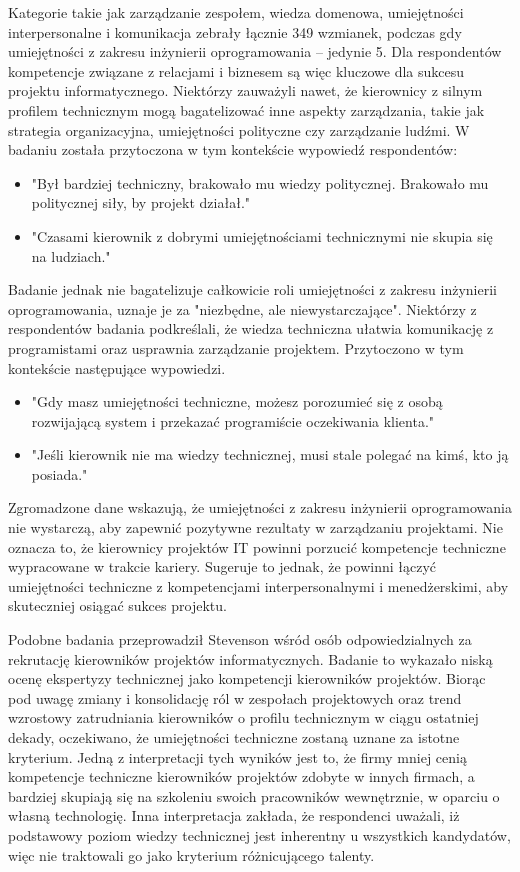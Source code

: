 Kategorie takie jak zarządzanie zespołem, wiedza domenowa, umiejętności interpersonalne i komunikacja zebrały łącznie 349 wzmianek, podczas gdy umiejętności z zakresu inżynierii oprogramowania – jedynie 5. Dla respondentów kompetencje związane z relacjami i biznesem są więc kluczowe dla sukcesu projektu informatycznego. Niektórzy zauważyli nawet, że kierownicy z silnym profilem technicznym mogą bagatelizować inne aspekty zarządzania, takie jak strategia organizacyjna, umiejętności polityczne czy zarządzanie ludźmi. W badaniu została przytoczona w tym kontekście wypowiedź respondentów:
\begin{itemize}
    \item"Był bardziej techniczny, brakowało mu wiedzy politycznej. Brakowało mu politycznej siły, by projekt działał."
    \item"Czasami kierownik z dobrymi umiejętnościami technicznymi nie skupia się na ludziach." 
\end{itemize}

Badanie jednak nie bagatelizuje całkowicie roli umiejętności z zakresu inżynierii oprogramowania, uznaje je za "niezbędne, ale niewystarczające". Niektórzy z respondentów badania podkreślali, że wiedza techniczna ułatwia komunikację z programistami oraz usprawnia zarządzanie projektem. Przytoczono w tym kontekście następujące wypowiedzi.
\begin{itemize}
    \item"Gdy masz umiejętności techniczne, możesz porozumieć się z osobą rozwijającą system i przekazać programiście oczekiwania klienta."
    \item"Jeśli kierownik nie ma wiedzy technicznej, musi stale polegać na kimś, kto ją posiada."    
\end{itemize}

Zgromadzone dane wskazują, że umiejętności z zakresu inżynierii oprogramowania nie wystarczą, aby zapewnić pozytywne rezultaty w zarządzaniu projektami. Nie oznacza to, że kierownicy projektów IT powinni porzucić kompetencje techniczne wypracowane w trakcie kariery. Sugeruje to jednak, że powinni łączyć umiejętności techniczne z kompetencjami interpersonalnymi i menedżerskimi, aby skuteczniej osiągać sukces projektu.\autocite{silva2015project}


Podobne badania przeprowadził Stevenson wśród osób odpowiedzialnych za rekrutację kierowników projektów informatycznych.\autocite{stevenson2010pm} Badanie to wykazało niską ocenę ekspertyzy technicznej jako kompetencji kierowników projektów. Biorąc pod uwagę zmiany i konsolidację ról w zespołach projektowych oraz trend wzrostowy zatrudniania kierowników o profilu technicznym w ciągu ostatniej dekady, oczekiwano, że umiejętności techniczne zostaną uznane za istotne kryterium. Jedną z interpretacji tych wyników jest to, że firmy mniej cenią kompetencje techniczne kierowników projektów zdobyte w innych firmach, a bardziej skupiają się na szkoleniu swoich pracowników wewnętrznie, w oparciu o własną technologię. Inna interpretacja zakłada, że respondenci uważali, iż podstawowy poziom wiedzy technicznej jest inherentny u wszystkich kandydatów, więc nie traktowali go jako kryterium różnicującego talenty.

